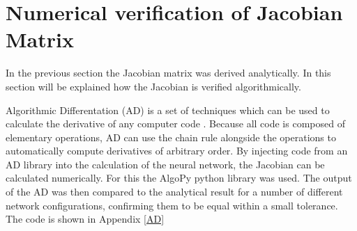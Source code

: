 \section{Numerical verification of Jacobian Matrix}
In the previous section the Jacobian matrix was derived analytically. In this section will be explained how the Jacobian is verified algorithmically.

Algorithmic Differentation (AD) is a set of techniques which can be used to calculate the derivative of any computer code \cite{Rall1981}. Because all code is composed of elementary operations, AD can use the chain rule alongside the operations to automatically compute derivatives of arbitrary order. By injecting code from an AD library into the calculation of the neural network, the Jacobian can be calculated numerically. For this the AlgoPy python library was used. The output of the AD was then compared to the analytical result for a number of different network configurations, confirming them to be equal within a small tolerance. The code is shown in Appendix \ref{AD}

